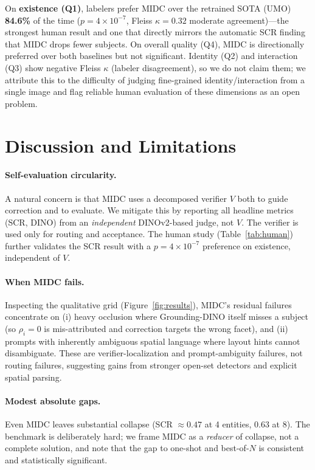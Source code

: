 \documentclass[letterpaper]{article}
\begin{document}
On \textbf{existence (Q1)}, labelers prefer MIDC over the retrained SOTA (UMO) \textbf{84.6\%} of the time ($p{=}4{\times}10^{-7}$, Fleiss $\kappa{=}0.32$ moderate agreement)---the strongest human result and one that directly mirrors the automatic SCR finding that MIDC drops fewer subjects. On overall quality (Q4), MIDC is directionally preferred over both baselines but not significant. Identity (Q2) and interaction (Q3) show negative Fleiss $\kappa$ (labeler disagreement), so we do not claim them; we attribute this to the difficulty of judging fine-grained identity/interaction from a single image and flag reliable human evaluation of these dimensions as an open problem.

\section{Discussion and Limitations}

\paragraph{Self-evaluation circularity.} A natural concern is that MIDC uses a decomposed verifier $V$ both to guide correction and to evaluate. We mitigate this by reporting all headline metrics (SCR, DINO) from an \emph{independent} DINOv2-based judge, not $V$. The verifier is used only for routing and acceptance. The human study (Table~\ref{tab:human}) further validates the SCR result with a $p{=}4{\times}10^{-7}$ preference on existence, independent of $V$.

\paragraph{When MIDC fails.} Inspecting the qualitative grid (Figure~\ref{fig:results}), MIDC's residual failures concentrate on (i) heavy occlusion where Grounding-DINO itself misses a subject (so $\rho_i{=}0$ is mis-attributed and correction targets the wrong facet), and (ii) prompts with inherently ambiguous spatial language where layout hints cannot disambiguate. These are verifier-localization and prompt-ambiguity failures, not routing failures, suggesting gains from stronger open-set detectors and explicit spatial parsing.

\paragraph{Modest absolute gaps.} Even MIDC leaves substantial collapse (SCR $\approx 0.47$ at 4 entities, $0.63$ at 8). The benchmark is deliberately hard; we frame MIDC as a \emph{reducer} of collapse, not a complete solution, and note that the gap to one-shot and best-of-$N$ is consistent and statistically significant.
\end{document}
